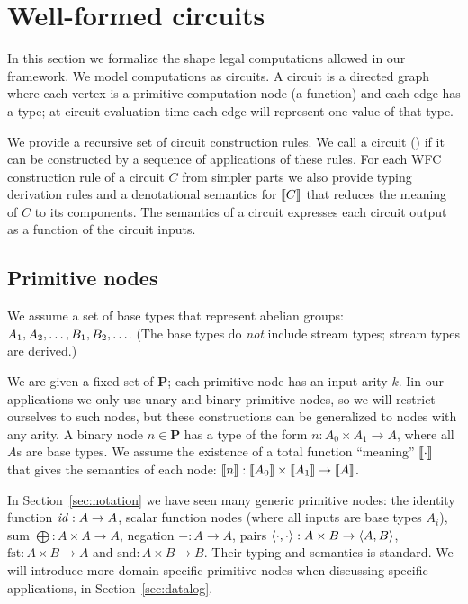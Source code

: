\section{Well-formed circuits}\label{sec:wfc}

In this section we formalize the shape legal computations allowed in our framework.
We model computations as circuits.  A circuit is a directed graph where each vertex is a 
primitive computation node (a function) and each edge has a type; at circuit evaluation time each 
edge will represent one value of that type.  

We provide a recursive set of circuit construction rules.  
We call a circuit  () if it can be 
constructed by a sequence of applications of these rules.  For each 
WFC construction rule of a circuit $C$ from simpler parts 
we also provide typing derivation rules and a denotational semantics for $\llbracket C \rrbracket$ 
that reduces the meaning of $C$ to its components.  The semantics of a 
circuit expresses each circuit output as a function of the circuit inputs.

\subsection{Primitive nodes}

\newcommand{\primitives}{\ensuremath{\mathbf{P}}}

We assume a set of base types that represent abelian groups: $A_1, A_2, 
\ldots, \\ B_1, B_2, \ldots$.  (The base types 
do \emph{not} include stream types; stream types are derived.)

We are given a fixed set of  $\primitives$; 
each primitive node has an input arity $k$.  Iin our applications 
we only use unary and binary primitive nodes, so we will restrict ourselves to such nodes,
but these constructions can be generalized to nodes with any arity.
A binary node $n \in \primitives$ has a type of the form 
$n: A_0 \times A_1 \rightarrow A$, where all $A$s are base types.
We assume the existence of a total function ``meaning'' $\llbracket \cdot \rrbracket$ 
that gives the semantics of each node: 
$\llbracket n \rrbracket : \llbracket A_0 \rrbracket \times \llbracket A_1 \rrbracket \rightarrow \llbracket A \rrbracket$.  

In Section~\ref{sec:notation} we have seen many generic primitive nodes:
the identity function $\mathit{id}: A \rightarrow A$, 
scalar function nodes (where all inputs are base types $A_i$), 
sum $\bigoplus: A \times A \rightarrow A$, negation $-: A \rightarrow A$,
pairs $\langle \cdot,\cdot \rangle: A \times B \rightarrow \langle A,B \rangle$,
$\mbox{fst}: A \times B \rightarrow A$ and $\mbox{snd}: A \times B \rightarrow B$.
Their typing and semantics is standard.  We will introduce more domain-specific
primitive nodes when discussing specific applications, in Section~\ref{sec:datalog}.


